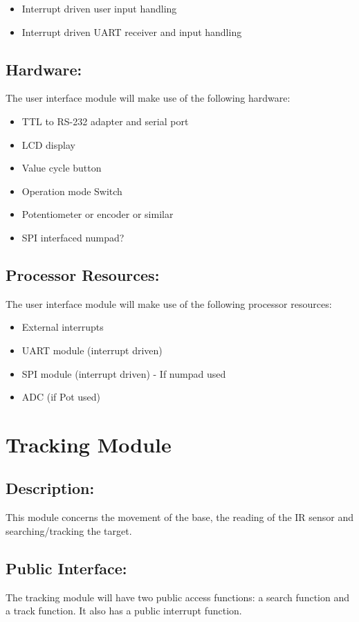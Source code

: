 \documentclass[]{article}
\begin{document}
\begin{itemize}
	\item Interrupt driven user input handling
	\item Interrupt driven UART receiver and input handling
\end{itemize}

\subsection{Hardware:}
The user interface module will make use of the following hardware:
\begin{itemize}
	\item TTL to RS-232 adapter and serial port
	\item LCD display
	\item Value cycle button
	\item Operation mode Switch
	\item Potentiometer or encoder or similar
	\item SPI interfaced numpad?
\end{itemize}

\subsection{Processor Resources:}
The user interface module will make use of the following processor resources:
\begin{itemize}
	\item External interrupts
	\item UART module (interrupt driven)
	\item SPI module (interrupt driven) - If numpad used
	\item ADC (if Pot used)
\end{itemize}

\newpage
\section{Tracking Module}

\subsection{Description:}
This module concerns the movement of the base, the reading of the IR sensor and searching/tracking the target.

\subsection{Public Interface:}
The tracking module will have two public access functions: a search function and a track function. It also has a public interrupt function.
\end{document}
